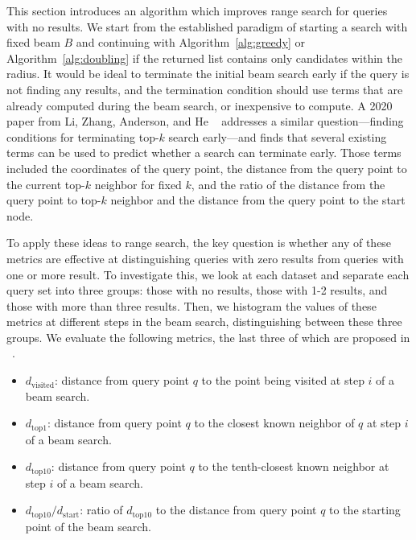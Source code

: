 This section introduces an algorithm which improves range search for queries with no results. We start from the established paradigm of starting a search with fixed beam $B$ and continuing with Algorithm~\ref{alg:greedy} or Algorithm~\ref{alg:doubling} if the returned list contains only candidates within the radius. It would be ideal to terminate the initial beam search early if the query is not finding any results, and the termination condition should use terms that are already computed during the beam search, or inexpensive to compute. A 2020 paper from Li, Zhang, Anderson, and He
~\cite{li2020improving} addresses a similar question---finding conditions for terminating top-$k$ search early---and finds that several existing terms can be used to predict whether a search can terminate early. Those terms included the coordinates of the query point, the distance from the query point to the current top-$k$ neighbor for fixed $k$, and the ratio of the distance from the query point to top-$k$ neighbor and the distance from the query point to the start node. 

To apply these ideas to range search, the key question is whether any of these metrics are effective at distinguishing queries with zero results from queries with one or more result. To investigate this, we look at each dataset and separate each query set into three groups: those with no results, those with 1-2 results, and those with more than three results. Then, we histogram the values of these metrics at different steps in the beam search, distinguishing between these three groups. We evaluate the following metrics, the last three of which are proposed in ~\cite{li2020improving}. 

\begin{itemize}[noitemsep,nosep]
	\item $d_{\text{visited}}$: distance from query point $q$ to the point being visited at step $i$ of a beam search.
	\item $d_{\text{top1}}$: distance from query point $q$ to the closest known neighbor of $q$ at step $i$ of a beam search.
	\item $d_{\text{top10}}$: distance from query point $q$ to the tenth-closest known neighbor at step $i$ of a beam search.
	\item $d_{\text{top10}} / d_{\text{start}}$: ratio of $d_{\text{top10}}$ to the distance from query point $q$ to the starting point of the beam search.
\end{itemize}

